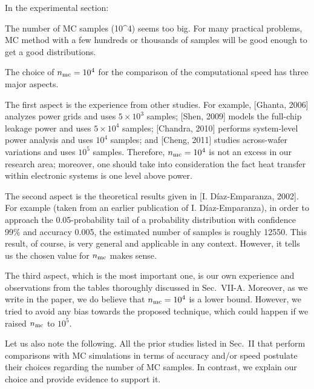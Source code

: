 \begin{reviewer}
In the experimental section:

The number of MC samples (10\^{}4) seems too big. For many practical problems, MC method with a few hundreds or thousands of samples will be good enough to get a good distributions.
\end{reviewer}
\begin{authors}
The choice of ${n_\text{mc}} = 10^4$ for the comparison of the computational speed has three major aspects.

The first aspect is the experience from other studies.
For example, [Ghanta, 2006] analyzes power grids and uses $5 \times 10^3$ samples; [Shen, 2009] models the full-chip leakage power and uses $5 \times 10^4$ samples; [Chandra, 2010] performs system-level power analysis and uses $10^4$ samples; and [Cheng, 2011] studies across-wafer variations and uses $10^5$ samples.
Therefore, ${n_\text{mc}} = 10^4$ is not an excess in our research area; moreover, one should take into consideration the fact heat transfer within electronic systems is one level above power.

The second aspect is the theoretical results given in [I. D\'{i}az-Emparanza, 2002].
For example (taken from an earlier publication of I. D\'{i}az-Emparanza), in order to approach the 0.05-probability tail of a probability distribution with confidence 99\% and accuracy 0.005, the estimated number of samples is roughly 12550.
This result, of course, is very general and applicable in any context.
However, it tells us the chosen value for ${n_\text{mc}}$ makes sense.

The third aspect, which is the most important one, is our own experience and observations from the tables thoroughly discussed in Sec.~VII-A.
Moreover, as we write in the paper, we do believe that ${n_\text{mc}} = 10^4$ is a lower bound.
However, we tried to avoid any bias towards the proposed technique, which could happen if we raised ${n_\text{mc}}$ to $10^5$.

Let us also note the following.
All the prior studies listed in Sec.~II that perform comparisons with MC simulations in terms of accuracy and/or speed postulate their choices regarding the number of MC samples.
In contrast, we explain our choice and provide evidence to support it.
\end{authors}

